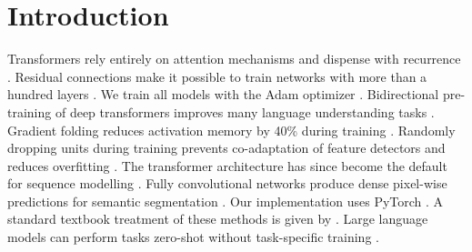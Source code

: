 \documentclass{article}
\begin{document}
\section{Introduction}
Transformers rely entirely on attention mechanisms and dispense with recurrence \citep{vaswani2017attention}.
Residual connections make it possible to train networks with more than a hundred layers \citep{he2016resnet}.
We train all models with the Adam optimizer \citep{kingma2014adam}.
Bidirectional pre-training of deep transformers improves many language understanding tasks \citep{devlin2019bert}.
Gradient folding reduces activation memory by 40\% during training \citep{chen2023gradfold}.
Randomly dropping units during training prevents co-adaptation of feature detectors and reduces overfitting \citep{smith2014dropout}.
The transformer architecture has since become the default for sequence modelling \citep{vaswani2017transformer, devlin2019bert}.
Fully convolutional networks produce dense pixel-wise predictions for semantic segmentation \citep{hochreiter1997lstm}.
Our implementation uses PyTorch \citep{pytorch}.
A standard textbook treatment of these methods is given by \citet{goodfellow2016deep}.
Large language models can perform tasks zero-shot without task-specific training \citep{radford2019gpt2}.



\end{document}
